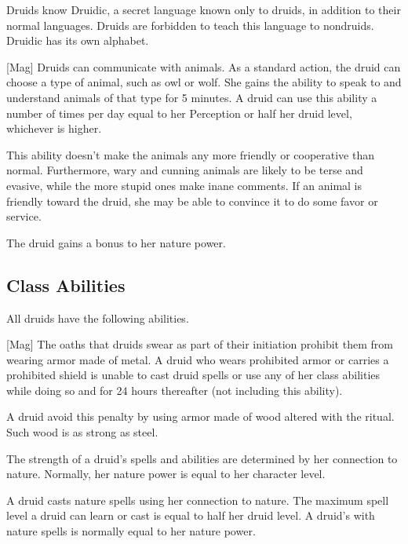         Druids know Druidic, a secret language known only to druids, in addition to their normal languages.
        Druids are forbidden to teach this language to nondruids.
        Druidic has its own alphabet.

        [Mag]
        Druids can communicate with animals.
        As a standard action, the druid can choose a type of animal, such as owl or wolf.
        She gains the ability to speak to and understand animals of that type for 5 minutes.
        A druid can use this ability a number of times per day equal to her Perception or half her druid level, whichever is higher.

        This ability doesn't make the animals any more friendly or cooperative than normal.
        Furthermore, wary and cunning animals are likely to be terse and evasive, while the more stupid ones make inane comments.
        If an animal is friendly toward the druid, she may be able to convince it to do some favor or service.

        The druid gains a  bonus to her nature power.

    \subsection{Class Abilities}
        All druids have the following abilities.

        [Mag]
        The oaths that druids swear as part of their initiation prohibit them from wearing armor made of metal.
        A druid who wears prohibited armor or carries a prohibited shield is unable to cast druid spells or use any of her  class abilities while doing so and for 24 hours thereafter (not including this ability).
        
        A druid avoid this penalty by using armor made of wood altered with the  ritual.
        Such wood is as strong as steel.

        The strength of a druid's spells and abilities are determined by her connection to nature.
        Normally, her nature power is equal to her character level.

        A druid casts nature spells using her connection to nature.
        The maximum spell level a druid can learn or cast is equal to half her druid level.
        A druid's  with nature spells is normally equal to her nature power.

